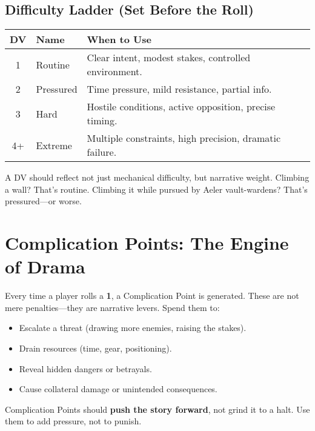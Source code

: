 \subsection*{Difficulty Ladder (Set Before the Roll)}

\begin{center}
\begin{tabular}{cll}
\toprule
\textbf{DV} & \textbf{Name} & \textbf{When to Use} \\
\midrule
1 & Routine\index{Difficulty Value!Routine} & Clear intent, modest stakes, controlled environment. \\
2 & Pressured\index{Difficulty Value!Pressured} & Time pressure, mild resistance, partial info. \\
3 & Hard\index{Difficulty Value!Hard} & Hostile conditions, active opposition, precise timing. \\
4+ & Extreme\index{Difficulty Value!Extreme} & Multiple constraints, high precision, dramatic failure. \\
\bottomrule
\end{tabular}
\end{center}

A DV should reflect not just mechanical difficulty, but narrative weight. Climbing a wall? That's routine. Climbing it while pursued by Aeler vault-wardens? That's pressured---or worse.

\section*{Complication Points: The Engine of Drama}

Every time a player rolls a \textbf{1}, a Complication Point is generated. These are not mere penalties---they are narrative levers. Spend them to:

\begin{itemize}
    \item Escalate a threat (drawing more enemies, raising the stakes).
    \item Drain resources (time, gear, positioning).
    \item Reveal hidden dangers or betrayals.
    \item Cause collateral damage or unintended consequences.
\end{itemize}

Complication Points should \textbf{push the story forward}, not grind it to a halt. Use them to add pressure, not to punish.


